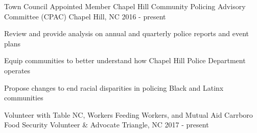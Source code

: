 \begin{cventries}
  \cventry
    {Town Council Appointed Member} %
    {Chapel Hill Community Policing Advisory Committee (CPAC)} %
    {Chapel Hill, NC} %
    {2016 - present} %
    {
      \begin{cvitems} %
	\item {Review and provide analysis on annual and quarterly police reports and event plans}
	\item {Equip communities to better understand how Chapel Hill Police Department operates}
	\item {Propose changes to end racial disparities in policing Black and Latinx communities}
      \end{cvitems}
    }

  \cventry
    {Volunteer with Table NC, Workers Feeding Workers, and Mutual Aid Carrboro} %
    {Food Security Volunteer \& Advocate} %
    {Triangle, NC} %
    {2017 - present} %
    {}

\end{cventries}
